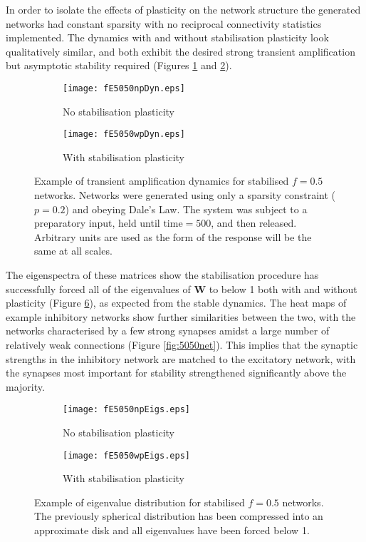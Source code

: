 \documentclass[12pt, a4paper]{article}
\begin{document}
In order to isolate the effects of plasticity on the network structure the generated networks had constant sparsity with no reciprocal connectivity statistics implemented.  The dynamics with and without stabilisation plasticity look qualitatively similar, and both exhibit the desired strong transient amplification but asymptotic stability required (Figures \ref{fig:5050npDyn} and \ref{fig:5050wpDyn}).

\begin{figure}[Thb]
   \begin{subfigure}{0.5\linewidth}   
      \texttt{[image: fE5050npDyn.eps]}
      \caption{No stabilisation plasticity}
      \label{fig:5050npDyn}
   \end{subfigure}
   \hspace{\fill}   %
   \begin{subfigure}{0.5\linewidth}
      \texttt{[image: fE5050wpDyn.eps]}
      \caption{With stabilisation plasticity}
      \label{fig:5050wpDyn}
   \end{subfigure}
   \caption{Example of transient amplification dynamics for stabilised $f = 0.5$ networks.  Networks were generated using only a sparsity constraint ($p = 0.2$) and obeying Dale's Law.  The system was subject to a preparatory input, held until $\text{time} = 500$, and then released. Arbitrary units are used as the form of the response will be the same at all scales.}
    \label{fig:5050dyn}
\end{figure}


The eigenspectra of these matrices show the stabilisation procedure has successfully forced all of the eigenvalues of $\mathbf{W}$ to below 1 both with and without plasticity (Figure \ref{fig:5050Eig}), as expected from the stable dynamics.   The heat maps of example inhibitory networks show further similarities between the two, with the networks characterised by a few strong synapses amidst a large number of relatively weak connections (Figure \ref{fig:5050net}).  This implies that the synaptic strengths in the inhibitory network are matched to the excitatory network, with the synapses most important for stability strengthened significantly above the majority.  


\begin{figure}[Thb]
   \begin{subfigure}{0.5\linewidth}
      \texttt{[image: fE5050npEigs.eps]}
      \caption{No stabilisation plasticity}
      \label{fig:5050npEig}
   \end{subfigure}
   \hspace{\fill}   %
   \begin{subfigure}{0.5\linewidth}
      \texttt{[image: fE5050wpEigs.eps]}
      \caption{With stabilisation plasticity}
      \label{fig:5050wpEig}
   \end{subfigure}
   \caption{Example of eigenvalue distribution for stabilised $f = 0.5$ networks.  The previously spherical distribution has been compressed into an approximate disk and all eigenvalues have been forced below 1.}
    \label{fig:5050Eig}
\end{figure}
\end{document}
